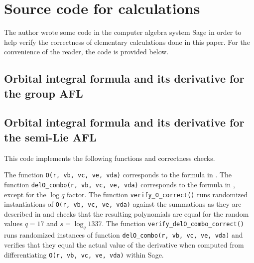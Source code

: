 \chapter{Source code for calculations}
The author wrote some code in the computer algebra system Sage
in order to help verify the correctness of elementary calculations done in this paper.
For the convenience of the reader, the code is provided below.

\section{Orbital integral formula and its derivative for the group AFL}

\section{Orbital integral formula and its derivative for the semi-Lie AFL}
This code implements the following functions and correctness checks.
\begin{itemize}
  \ii The function \texttt{O(r, vb, vc, ve, vda)}
  corresponds to the formula in .
  \ii The function \texttt{delO\_combo(r, vb, vc, ve, vda)}
  corresponds to the formula in ,
  except for the $\log q$ factor.
  \ii The function \texttt{verify\_O\_correct()}
  runs randomized instantiations of \texttt{O(r, vb, vc, ve, vda)}
  against the summations as they are described in 
  and checks that the resulting polynomials are equal for the random values
  $q = 17$ and $s = \log_q 1337$.
  \ii The function \texttt{verify\_delO\_combo\_correct()}
  runs randomized instances of
  function \texttt{delO\_combo(r, vb, vc, ve, vda)}
  and verifies that they equal the actual value of the derivative
  when computed from differentiating \texttt{O(r, vb, vc, ve, vda)} within Sage.
\end{itemize}


